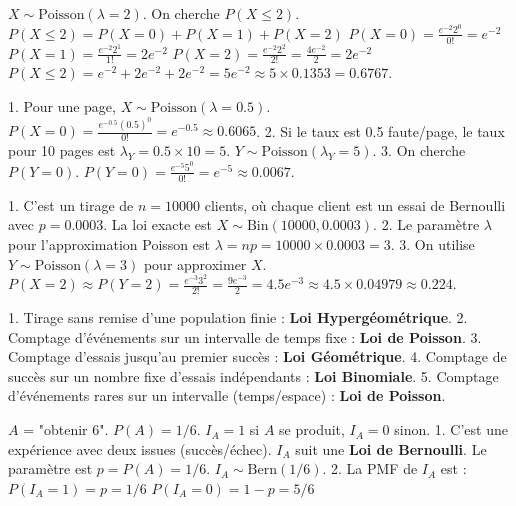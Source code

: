 \begin{correctionbox}
$X \sim \text{Poisson}(\lambda=2)$. On cherche $P(X \le 2)$.
$P(X \le 2) = P(X=0) + P(X=1) + P(X=2)$
$P(X=0) = \frac{e^{-2} 2^0}{0!} = e^{-2}$
$P(X=1) = \frac{e^{-2} 2^1}{1!} = 2e^{-2}$
$P(X=2) = \frac{e^{-2} 2^2}{2!} = \frac{4e^{-2}}{2} = 2e^{-2}$
$P(X \le 2) = e^{-2} + 2e^{-2} + 2e^{-2} = 5e^{-2} \approx 5 \times 0.1353 = 0.6767$.
\end{correctionbox}

\begin{correctionbox}
1.  Pour une page, $X \sim \text{Poisson}(\lambda=0.5)$.
    $P(X=0) = \frac{e^{-0.5} (0.5)^0}{0!} = e^{-0.5} \approx 0.6065$.
2.  Si le taux est 0.5 faute/page, le taux pour 10 pages est $\lambda_Y = 0.5 \times 10 = 5$.
    $Y \sim \text{Poisson}(\lambda_Y=5)$.
3.  On cherche $P(Y=0)$.
    $P(Y=0) = \frac{e^{-5} 5^0}{0!} = e^{-5} \approx 0.0067$.
\end{correctionbox}

\begin{correctionbox}
1.  C'est un tirage de $n=10000$ clients, où chaque client est un essai de Bernoulli avec $p=0.0003$. La loi exacte est $X \sim \text{Bin}(10000, 0.0003)$.
2.  Le paramètre $\lambda$ pour l'approximation Poisson est $\lambda = np = 10000 \times 0.0003 = 3$.
3.  On utilise $Y \sim \text{Poisson}(\lambda=3)$ pour approximer $X$.
    $P(X=2) \approx P(Y=2) = \frac{e^{-3} 3^2}{2!} = \frac{9e^{-3}}{2} = 4.5 e^{-3} \approx 4.5 \times 0.04979 \approx 0.224$.
\end{correctionbox}


\begin{correctionbox}
1.  Tirage sans remise d'une population finie : \textbf{Loi Hypergéométrique}.
2.  Comptage d'événements sur un intervalle de temps fixe : \textbf{Loi de Poisson}.
3.  Comptage d'essais jusqu'au premier succès : \textbf{Loi Géométrique}.
4.  Comptage de succès sur un nombre fixe d'essais indépendants : \textbf{Loi Binomiale}.
5.  Comptage d'événements rares sur un intervalle (temps/espace) : \textbf{Loi de Poisson}.
\end{correctionbox}

\begin{correctionbox}
$A$ = "obtenir 6". $P(A) = 1/6$.
$I_A = 1$ si $A$ se produit, $I_A = 0$ sinon.
1.  C'est une expérience avec deux issues (succès/échec). $I_A$ suit une \textbf{Loi de Bernoulli}.
    Le paramètre est $p = P(A) = 1/6$. $I_A \sim \text{Bern}(1/6)$.
2.  La PMF de $I_A$ est :
    $P(I_A = 1) = p = 1/6$
    $P(I_A = 0) = 1-p = 5/6$
\end{correctionbox}


